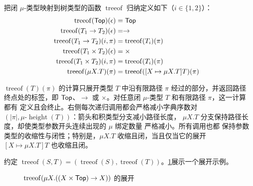 \begin{definition}
\label{def:21.8.3}
把闭 \(\mu\)-类型映射到树类型的函数
\(\operatorname{treeof}\) 归纳定义如下（\(i\in\{1,2\}\)）：
\[
\begin{aligned}
\operatorname{treeof}(\mathsf{Top})(\epsilon)
  &=\mathsf{Top}\\
\operatorname{treeof}(T_1\to T_2)(\epsilon)
  &=\to\\
\operatorname{treeof}(T_1\to T_2)(i,\pi)
  &=\operatorname{treeof}(T_i)(\pi)\\
\operatorname{treeof}(T_1\times T_2)(\epsilon)
  &=\times\\
\operatorname{treeof}(T_1\times T_2)(i,\pi)
  &=\operatorname{treeof}(T_i)(\pi)\\
\operatorname{treeof}(\mu X.T)(\pi)
  &=\operatorname{treeof}([X\mapsto\mu X.T]T)(\pi)
\end{aligned}
\]
\end{definition}

\(\operatorname{treeof}(T)(\pi)\) 的计算只展开类型 \(T\) 中沿有限路径
\(\pi\) 经过的部分，并返回路径终点处的标签，即 \(\mathsf{Top}\)、\(\to\)
或 \(\times\)。对任意闭 \(\mu\)-类型 \(T\) 和有限路径 \(\pi\)，这一计算都有
定义且会终止。右侧每次递归调用都会严格减小字典序数对
\((|\pi|,\mu\text{-}\operatorname{height}(T))\)：箭头和积类型分支减小路径长度，
\(\mu X.T\) 分支保持路径长度，却使类型参数开头连续出现的 \(\mu\) 绑定数量
严格减小。所有调用也都
保持参数类型的收缩性与闭性；特别是，\(\mu X.T\) 收缩且闭，当且仅当它的展开
\([X\mapsto\mu X.T]T\) 也收缩且闭。

约定
\(\operatorname{treeof}(S,T)=(\operatorname{treeof}(S),
\operatorname{treeof}(T))\)。\cref{fig:21-3}展示一个展开示例。

\begin{figure}[!ht]
\centering
{}
\caption{\(\operatorname{treeof}(\mu X.((X\times\mathsf{Top})\to X))\) 的展开}
\label{fig:21-3}
\end{figure}

